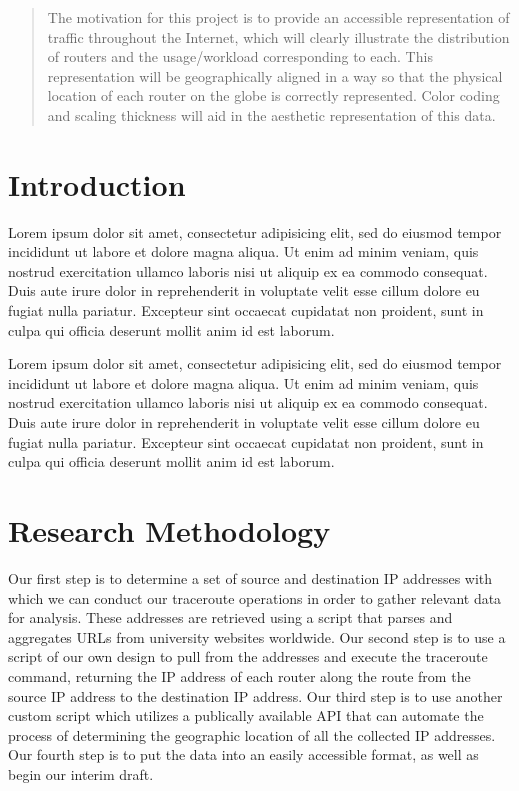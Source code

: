 \documentclass{sigcomm-alternate}
\begin{document}
\maketitle

\begin{abstract}
    The motivation for this project is to provide an accessible representation of traffic throughout the Internet, which will clearly illustrate the distribution of routers and the usage/workload corresponding to each. This representation will be geographically aligned in a way so that the physical location of each router on the globe is correctly represented. Color coding and scaling thickness will aid in the aesthetic representation of this data.
\end{abstract}

\section{Introduction}
Lorem ipsum dolor sit amet, consectetur adipisicing elit, sed do eiusmod tempor incididunt ut labore et dolore magna aliqua. Ut enim ad minim veniam, quis nostrud exercitation ullamco laboris nisi ut aliquip ex ea commodo\cite{latexcompanion} consequat. Duis aute irure dolor in reprehenderit in voluptate velit esse cillum dolore eu fugiat nulla pariatur. Excepteur sint occaecat cupidatat non proident, sunt in culpa qui officia deserunt mollit anim id est laborum.

Lorem ipsum dolor sit amet, consectetur\cite{einstein} adipisicing elit, sed do eiusmod tempor incididunt ut labore et dolore magna aliqua. Ut enim ad minim veniam, quis nostrud exercitation ullamco laboris nisi ut aliquip ex ea commodo consequat. Duis aute irure dolor in reprehenderit\cite{knuthwebsite} in voluptate velit esse cillum dolore eu fugiat nulla pariatur. Excepteur sint occaecat cupidatat non proident, sunt in culpa qui officia deserunt mollit anim id est laborum.


\section{Research Methodology}

Our first step is to determine a set of source and destination IP addresses with which we can conduct our traceroute operations in order to gather relevant data for analysis. These addresses are retrieved using a script that parses and aggregates URLs from university websites worldwide. Our second step is to use a script of our own design to pull from the addresses and execute the traceroute command, returning the IP address of each router along the route from the source IP address to the destination IP address. Our third step is to use another custom script which utilizes a publically available API that can automate the process of determining the geographic location of all the collected IP addresses. Our fourth step is to put the data into an easily accessible format, as well as begin our interim draft.  
\end{document}
